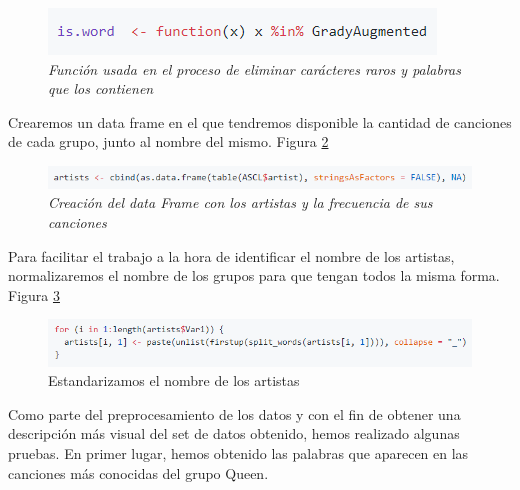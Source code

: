 \begin{figure}[h]
	\centering
	\includegraphics[width=0.8\linewidth]{Imagenes/isWord}
	\caption{\textit {Función usada en el proceso de eliminar carácteres raros y palabras que los contienen}}
	\label{fig:isWord}
\end{figure}

Crearemos un data frame en el que tendremos disponible la cantidad de canciones de cada grupo, junto al nombre del mismo. Figura \ref{fig:artistsDatframe}

\begin{figure}[h]
	\centering
	\includegraphics[width=0.9\linewidth]{Imagenes/artistsDatframe}
	\caption{\textit{Creación del data Frame con los artistas y la frecuencia de sus canciones}}
	\label{fig:artistsDatframe}
\end{figure}

Para facilitar el trabajo a la hora de identificar el nombre de los artistas, normalizaremos el nombre de los grupos para que tengan todos la misma forma. Figura \ref{fig:artistsStand}

\begin{figure}[h]
	\centering
	\includegraphics[width=0.9\linewidth]{Imagenes/artistsStand}
	\caption{Estandarizamos el nombre de los artistas}
	\label{fig:artistsStand}
\end{figure}



Como parte del preprocesamiento de los datos y con el fin de obtener una descripción más visual del set de datos obtenido, hemos realizado algunas pruebas. En primer lugar, hemos obtenido las palabras que aparecen en las canciones más conocidas del grupo Queen.

